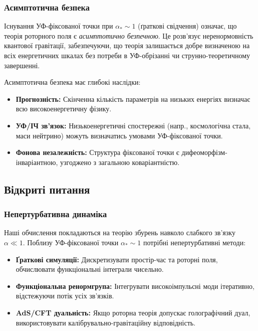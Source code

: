 \documentclass[11pt,a4paper]{article}
\numberwithin{equation}{section}
\theoremstyle{plain}
\theoremstyle{definition}
\theoremstyle{remark}
\begin{document}
\subsubsection{Асимптотична безпека}

Існування УФ-фіксованої точки при $\alpha_*\sim 1$ (ґраткові свідчення) означає, що теорія роторного поля є \emph{асимптотично безпечною}. Це розв'язує неренормовність квантової гравітації, забезпечуючи, що теорія залишається добре визначеною на всіх енергетичних шкалах без потреби в УФ-обрізанні чи струнно-теоретичному завершенні.

Асимптотична безпека має глибокі наслідки:
\begin{itemize}
  \item \textbf{Прогнозність:} Скінченна кількість параметрів на низьких енергіях визначає всю високоенергетичну фізику.
  \item \textbf{УФ/ІЧ зв'язок:} Низькоенергетичні спостережні (напр., космологічна стала, маси нейтрино) можуть визначатись умовами УФ-фіксованої точки.
  \item \textbf{Фонова незалежність:} Структура фіксованої точки є дифеоморфізм-інваріантною, узгоджено з загальною коваріантністю.
\end{itemize}

\subsection{Відкриті питання}

\subsubsection{Непертурбативна динаміка}

Наші обчислення покладаються на теорію збурень навколо слабкого зв'язку $\alpha\ll 1$. Поблизу УФ-фіксованої точки $\alpha_*\sim 1$ потрібні непертурбативні методи:
\begin{itemize}
  \item \textbf{Ґраткові симуляції:} Дискретизувати простір-час та роторні поля, обчислювати функціональні інтеграли чисельно.
  \item \textbf{Функціональна ренормгрупа:} Інтегрувати високоімпульсні моди ітеративно, відстежуючи потік усіх зв'язків.
  \item \textbf{AdS/CFT дуальність:} Якщо роторна теорія допускає голографічний дуал, використовувати калібрувально-гравітаційну відповідність.
\end{itemize}
\end{document}
